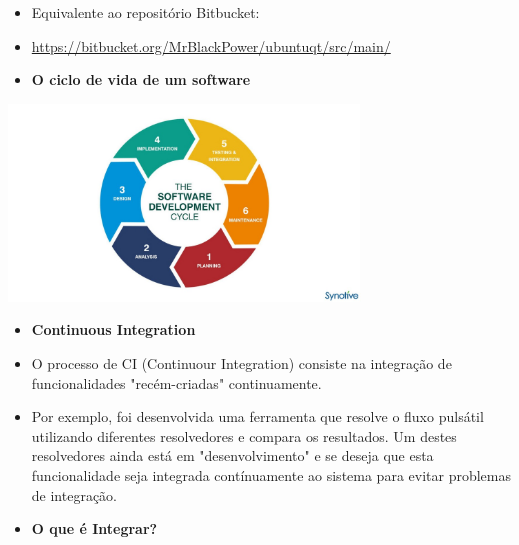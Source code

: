 \documentclass[10pt]{beamer}
\theoremstyle{remark}
\theoremstyle{definition}
\begin{document}
\begin{frame}[allowframebreaks]
\begin{itemize}
		\item Equivalente ao repositório Bitbucket:
		
		\item \href{https://bitbucket.org/MrBlackPower/ubuntuqt/src/main/}{https://bitbucket.org/MrBlackPower/ubuntuqt/src/main/}
	\end{itemize}
	
	\framebreak
	
	\begin{itemize}
		\item \textbf{O ciclo de vida de um software}
		
	\end{itemize}
	
	\begin{center}
		\includegraphics[width=0.7\textwidth]{images/05.jpg}
	\end{center}
	
	\framebreak
	
	\begin{itemize}
		\item \textbf{Continuous Integration}
		
		\item O processo de CI (Continuour Integration) consiste na integração de funcionalidades "recém-criadas" continuamente.
		
		\item Por exemplo, foi desenvolvida uma ferramenta que resolve o fluxo pulsátil utilizando diferentes resolvedores e compara os resultados. Um destes resolvedores ainda está em "desenvolvimento" e se deseja que esta funcionalidade seja integrada contínuamente ao sistema para evitar problemas de integração.
		
	\end{itemize}
	
	\framebreak
	
	\begin{itemize}
		\item \textbf{O que é Integrar?}
		

\end{itemize}
\end{frame}
\end{document}
